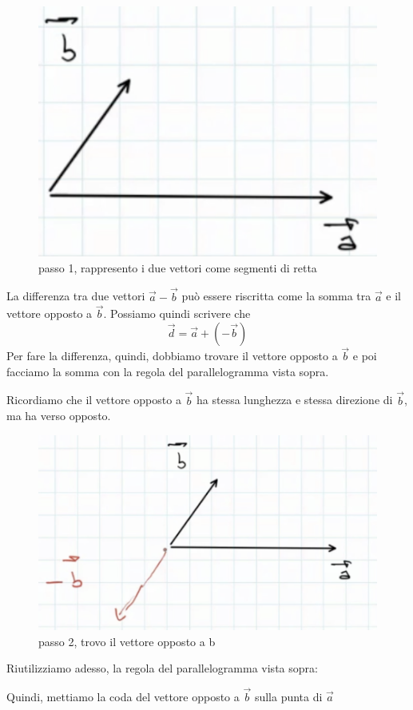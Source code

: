 \begin{figure}[h]
\begin{center}
\includegraphics[width = 0.5 \textwidth]{lezione1/images/differenza1}
\caption{passo 1, rappresento i due vettori come segmenti di retta}
\label{fig:differenza1}
\end{center}
\end{figure}

La differenza tra due vettori $\overrightarrow{a} - \overrightarrow{b} $ può essere riscritta come la somma tra $\overrightarrow{a}$ e il vettore opposto a $\overrightarrow{b}$. Possiamo quindi scrivere che
$$\overrightarrow{d} = \overrightarrow{a} + (-\overrightarrow{b}) $$
Per fare la differenza, quindi, dobbiamo trovare il vettore opposto a 
$\overrightarrow{b}$ e poi facciamo la somma con la regola del parallelogramma vista sopra.

Ricordiamo che il vettore opposto a $\overrightarrow{b}$ ha stessa lunghezza e stessa direzione di $\overrightarrow{b}$, ma ha verso opposto.

\begin{figure}[h]
\begin{center}
\includegraphics[width = 0.5 \textwidth]{lezione1/images/differenza2}
\caption{passo 2, trovo il vettore opposto a b}
\label{fig:differenza2}
\end{center}
\end{figure}
\newpage
Riutilizziamo adesso, la regola del parallelogramma vista sopra:

Quindi, mettiamo la coda del vettore opposto a $ \overrightarrow{b} $ sulla punta di
$\overrightarrow{a} $

